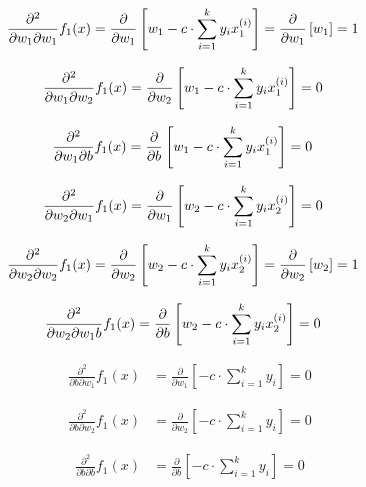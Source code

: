 \documentclass[12pt,landscape]{article}
\begin{document}
\begin{align}
\frac{\partial^2}{\partial w_1 \partial w_1} f_1(x) &=  \frac{\partial}{\partial w_1} \left[  w_1 - c \cdot \sum\limits_{i=1}^k y_i x_1^{(i)} \right]  = \frac{\partial}{\partial w_1} \left[ w_1 \right] = 1
\end{align}

\begin{align}
\frac{\partial^2}{\partial w_1 \partial w_2} f_1(x) &=  \frac{\partial}{\partial w_2} \left[  w_1 - c \cdot \sum\limits_{i=1}^k y_i x_1^{(i)} \right] =  0 \nonumber
\end{align}

\begin{align}
\frac{\partial^2}{\partial w_1 \partial b} f_1(x) &=  \frac{\partial}{\partial b} \left[  w_1 - c \cdot \sum\limits_{i=1}^k y_i x_1^{(i)} \right] = 0\nonumber
\end{align}

\begin{align}
\frac{\partial^2}{\partial w_2 \partial w_1} f_1(x) &=  \frac{\partial}{\partial w_1} \left[ w_2 - c \cdot \sum\limits_{i=1}^k y_i x_2^{(i)} \right] = 0\nonumber
\end{align}

\begin{align}
\frac{\partial^2}{\partial w_2 \partial w_2} f_1(x) &= \frac{\partial}{\partial w_2} \left[ w_2 - c \cdot \sum\limits_{i=1}^k y_i x_2^{(i)} \right] = \frac{\partial}{\partial w_2} \left[ w_2 \right] = 1
\end{align}

\begin{align}
\frac{\partial^2}{\partial w_2 \partial w_1 b} f_1(x) &= \frac{\partial}{\partial b} \left[ w_2 - c \cdot \sum\limits_{i=1}^k y_i x_2^{(i)} \right] = 0\nonumber
\end{align}

\begin{align}
\frac{\partial^2}{\partial b \partial w_1} f_1(x) &= \frac{\partial}{\partial w_1} \left[  - c \cdot \sum\limits_{i=1}^k y_i \right] = 0\nonumber
\end{align}

\begin{align}
\frac{\partial^2}{\partial b \partial w_2}  f_1(x) &= \frac{\partial}{\partial w_2} \left[  - c \cdot \sum\limits_{i=1}^k y_i \right] = 0 \nonumber
\end{align}

\begin{align}
\frac{\partial^2}{\partial b \partial b} f_1(x) &= \frac{\partial}{\partial b} \left[  - c \cdot \sum\limits_{i=1}^k y_i \right] = 0 \nonumber
\end{align}
\end{document}
